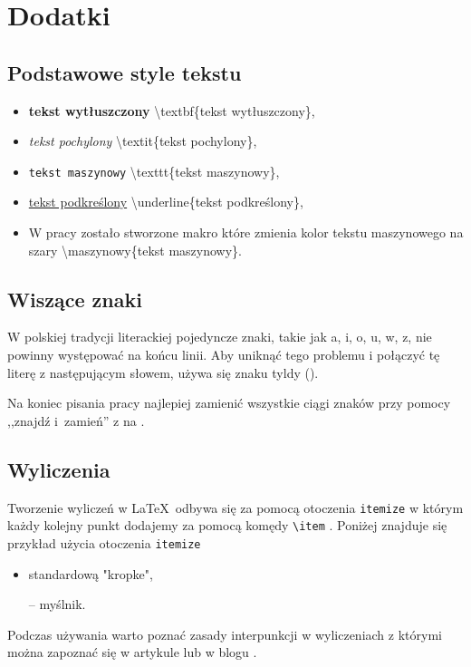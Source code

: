 \section{Dodatki}

\subsection{Podstawowe style tekstu}
\begin{itemize}
    \item \textbf{tekst wytłuszczony} \textbackslash textbf{\{tekst wytłuszczony\}},
    \item \textit{tekst pochylony} \textbackslash textit{\{tekst pochylony\}},

    \item \texttt{tekst maszynowy} \textbackslash texttt{\{tekst maszynowy\}},
     
    \item \underline{tekst podkreślony} \textbackslash underline{\{tekst podkreślony\}},
    \item W pracy zostało stworzone makro które zmienia kolor tekstu maszynowego na szary  \textbackslash maszynowy{\{tekst maszynowy\}}.
\end{itemize}
\subsection{Wiszące znaki}
W polskiej tradycji literackiej pojedyncze znaki, takie jak a, i, o, u, w, z, nie powinny występować na końcu linii. Aby uniknąć tego problemu i połączyć tę literę z następującym słowem, używa się znaku tyldy (\keys{\textasciitilde{}}).

Na koniec pisania pracy najlepiej zamienić wszystkie ciągi znaków przy pomocy ,,znajdź i~zamień'' z  na .

\subsection{Wyliczenia}
Tworzenie wyliczeń w \LaTeX\ odbywa się za pomocą otoczenia \texttt{itemize} w którym każdy kolejny punkt dodajemy za pomocą komędy \texttt{\textbackslash item} . Poniżej znajduje się przykład użycia otoczenia \texttt{itemize}
\begin{itemize}
    \item standardową "kropke",
    \item[--] myślnik.
\end{itemize}
Podczas używania warto poznać zasady interpunkcji w wyliczeniach z którymi można zapoznać się w artykule \cite{ekorekta24} lub w blogu \cite{contentwriter}.
